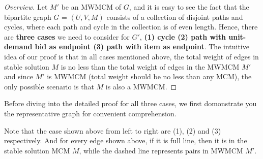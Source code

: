 \documentclass[11pt,a4paper]{article}
\begin{document}
\begin{proof}[Overview]
    Let $M'$ be an MWMCM of $G$, and it is easy to see the fact that the bipartite graph
    $G$ = $(U,V,M)$ consists of a collection of disjoint paths and cycles,
    where each path and cycle in the collection is of even length. Hence,
    there are {\bf three cases} we need to consider for $G'$, {\bf (1) cycle (2) path with
    unit-demand bid as endpoint (3) path with item as endpoint}. The intuitive
    idea of our proof is that in all cases mentioned above, the total weight
    of edges in stable solution $M$ is no less than the total weight of edges
    in the MWMCM $M'$ and since $M'$ is MWMCM (total weight should be no less
    than any MCM), the only possible scenario is that $M$ is also a MWMCM. 

\end{proof}

Before diving into the detailed proof for all three cases, we first
domonstrate you the representative graph for convenient comprehension.


Note that the case shown above from left to right are (1), (2) and (3)
respectively. And for every edge shown above, if it is full line, then it is
in the stable solution MCM $M$, while the dashed line represents pairs in
MWMCM $M'$.
\end{document}
